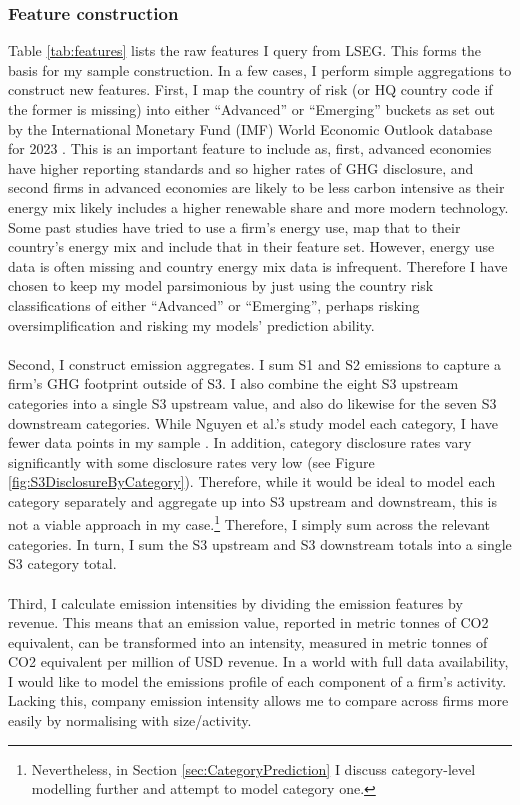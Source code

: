 \documentclass[12pt,twoside]{report}
\begin{document}
\subsubsection{Feature construction}\label{sec:FeatureConstruction}
Table \ref{tab:features} lists the raw features I query from LSEG. This forms the basis for my sample construction. In a few cases, I perform simple aggregations to construct new features. First, I map the country of risk (or HQ country code if the former is missing) into either ``Advanced'' or ``Emerging'' buckets as set out by the International Monetary Fund (IMF) World Economic Outlook database for 2023 \cite{IMFWEO2023}. This is an important feature to include as, first, advanced economies have higher reporting standards and so higher rates of GHG disclosure, and second firms in advanced economies are likely to be less carbon intensive as their energy mix likely includes a higher renewable share and more modern technology. Some past studies have tried to use a firm's energy use, map that to their country's energy mix and include that in their feature set. However, energy use data is often missing and country energy mix data is infrequent. Therefore I have chosen to keep my model parsimonious by just using the country risk classifications of either ``Advanced'' or ``Emerging'', perhaps risking oversimplification and risking my models' prediction ability.
\\\\
Second, I construct emission aggregates. I sum S1 and S2 emissions to capture a firm's GHG footprint outside of S3. I also combine the eight S3 upstream categories into a single S3 upstream value, and also do likewise for the seven S3 downstream categories. While Nguyen et al.'s study model each category, I have fewer data points in my sample \cite{Nguyenetal2023}. In addition, category disclosure rates vary significantly with some disclosure rates very low (see Figure \ref{fig:S3DisclosureByCategory}). Therefore, while it would be ideal to model each category separately and aggregate up into S3 upstream and downstream, this is not a viable approach in my case.\footnote{Nevertheless, in Section \ref{sec:CategoryPrediction} I discuss category-level modelling further and attempt to model category one.} Therefore, I simply sum across the relevant categories. In turn, I sum the S3 upstream and S3 downstream totals into a single S3 category total. 
\\\\
Third, I calculate emission intensities by dividing the emission features by revenue. This means that an emission value, reported in metric tonnes of CO2 equivalent, can be transformed into an intensity, measured in metric tonnes of CO2 equivalent per million of USD revenue. In a world with full data availability, I would like to model the emissions profile of each component of a firm's activity. Lacking this, company emission intensity allows me to compare across firms more easily by normalising with size/activity.  
\end{document}
